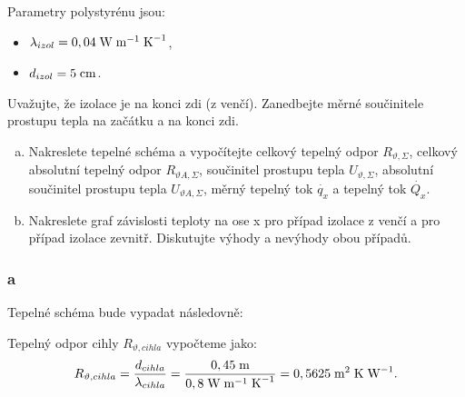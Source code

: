 \documentclass{article}
\begin{document}
Parametry polystyrénu jsou:
\begin{itemize}
    \item $\lambda_{izol} = 0,04 \; \textrm{W} \; \textrm{m}^{-1} \; \textrm{K}^{-1}$,
    \item $d_{izol} = 5 \; \textrm{cm}$.
\end{itemize}

Uvažujte, že izolace je na konci zdi (z venčí). Zanedbejte měrné součinitele prostupu tepla na začátku a na konci zdi.

\begin{enumerate}[a)]
    \item Nakreslete tepelné schéma a vypočítejte celkový tepelný odpor $R_{\vartheta,\Sigma}$, celkový absolutní tepelný odpor $R_{\vartheta A,\Sigma}$, součinitel prostupu tepla $U_{\vartheta,\Sigma}$, absolutní součinitel prostupu tepla $U_{\vartheta A,\Sigma}$, měrný tepelný tok $\dot{q_x}$ a tepelný tok $\dot{Q_x}$.
    \item Nakreslete graf závislosti teploty na ose x pro případ izolace z venčí a pro případ izolace zevnitř. Diskutujte výhody a nevýhody obou případů.
\end{enumerate}

\subsubsection{a}
Tepelné schéma bude vypadat následovně:

\begin{center}
\end{center}

Tepelný odpor cihly $R_{\vartheta,cihla}$ vypočteme jako:
$$
    R_{\vartheta,cihla} = \frac{d_{cihla}}{\lambda_{cihla}} = \frac{0,45 \; \textrm{m}}{0,8 \; \textrm{W} \; \textrm{m}^{-1} \; \textrm{K}^{-1}} = 0,5625 \; \textrm{m}^{\textrm{2}} \; \textrm{K} \; \textrm{W}^{-1}.
$$
\end{document}
